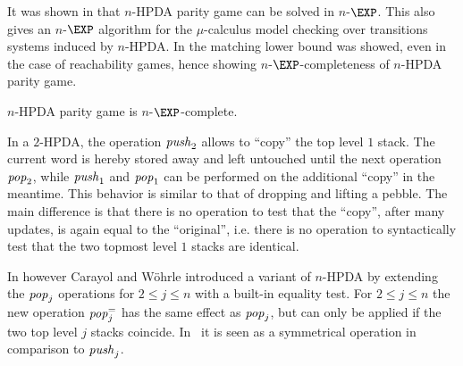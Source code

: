\documentclass[a4paper,UKenglish,cleveref, autoref, thm-restate]{lipics-v2021}
\begin{document}
It was shown in \cite{Cach03} that {\sc $n$-HPDA parity game} can
be solved in $n$-$\EXP$. This also gives an $n$-$\EXP$ algorithm for the $\mu$-calculus
model checking over transitions systems induced by  $n$-HPDA.
In \cite{cachat2007complexity} the matching lower bound was showed, even in the case of reachability games,
hence showing $n$-$\EXP$-completeness of {\sc $n$-HPDA parity game}.

\begin{theorem}{\cite{ Cach03, cachat2007complexity}}
{\sc $n$-HPDA parity game} is $n$-$\EXP$-complete.
\end{theorem}




In a $2$-HPDA, the operation $\text{\textit{push}}_2$ %
allows to ``copy'' the top level $1$ stack. The current word is hereby stored away and left untouched
until the next operation $\text{\textit{pop}}_2$,
while $\text{\textit{push}}_1$ and $\text{\textit{pop}}_1$ can be performed on the additional ``copy'' in the meantime. This behavior is similar to that of dropping and lifting a pebble. 
The main difference is that there is no operation to test that the ``copy'', after many updates, is again equal to the ``original'', i.e. there is no operation to syntactically test that the two topmost level $1$ stacks are identical.

In \cite{CaWoe03, Woeh05, carayol2006automates} however 
Carayol and W\"ohrle
 introduced a variant of $n$-HPDA by extending the 
$\text{\textit{pop}}_j$ operations for $2 \leq j \leq n$ with a built-in equality test. 
For $2 \leq j \leq n$ 
the new operation
$\text{\textit{pop}}_j^=$ has the same effect as $\text{\textit{pop}}_j$, but
can only be applied if the two top level $j$ stacks coincide.
In \cite{carayol2006automates} it is seen as a symmetrical operation in comparison to
$\text{\textit{push}}_j$.\\
\end{document}
